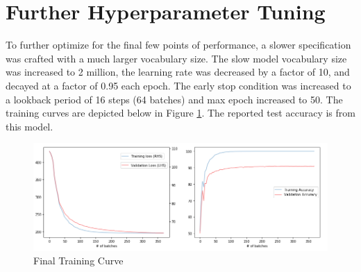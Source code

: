 \documentclass[a4paper,10pt]{article}
\begin{document}
\section{Further Hyperparameter Tuning}\label{furthertuning}
To further optimize for the final few points of performance, a slower specification was crafted with a much larger vocabulary size. The slow model vocabulary size was increased to 2 million, the learning rate was decreased by a factor of 10, and decayed at a factor of 0.95 each epoch. The early stop condition was increased to a lookback period of 16 steps (64 batches) and max epoch increased to 50. The training curves are depicted below in Figure \ref{fig:finalcurve}. The reported test accuracy is from this model.

\begin{figure}[h]
    \centering
    \includegraphics[scale=0.4]{finalcurve}
    \caption{Final Training Curve}
    \label{fig:finalcurve}
\end{figure}

\medskip


\end{document}
